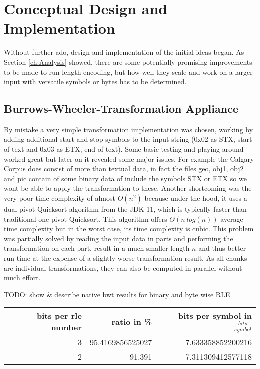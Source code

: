 
\chapter{Conceptual Design and Implementation}
\label{ch:Conceptual Design}
\par{
Without further ado, design and implementation of the initial ideas began. As Section \ref{ch:Analysis} showed, there are some potentially promising improvements to be made to run length encoding, but how well they scale and work on a larger input with versatile symbols or bytes has to be determined.
}

\section{Burrows-Wheeler-Transformation Appliance}
\par{
By mistake a very simple transformation implementation was chosen, working by adding additional start and stop symbols to the input string (0x02 as STX, start of text and 0x03 as ETX, end of text). Some basic testing and playing around worked great but later on it revealed some major issues. For example the Calgary Corpus does consist of more than textual data, in fact the files geo, obj1, obj2 and pic contain of some binary data of include the symbols STX or ETX so we wont be able to apply the transformation to these. Another shortcoming was the very poor time complexity of almost $O (n^2)$ because under the hood, it uses a dual pivot Quicksort algorithm from the JDK 11, which is typically faster than traditional one pivot Quicksort. This algorithm offers $\Theta (n \: log(n))$ average time complexity but in the worst case, its time complexity is cubic. This problem was partially solved by reading the input data in parts and performing the transformation on each part, result in a much smaller length $n$ and thus better run time at the expense of a slightly worse transformation result. As all chunks are individual transformations, they can also be computed in parallel without much effort.
}

\par{
TODO: show \& describe native bwt results for binary and byte wise RLE

\begin{center}
	\begin{tabular}[p]{r|r|r}
		\label{tab:t7 rle vertical reading}
		
		bits per rle number & ratio in \% & bits per symbol in $\frac{bits}{symbol}$\\
		\hline
		3 & 95.4169856525027 & 7.633358852200216\\
		2 & 91.391 & 7.311309412577118 \\
	\end{tabular}
\end{center}
}

